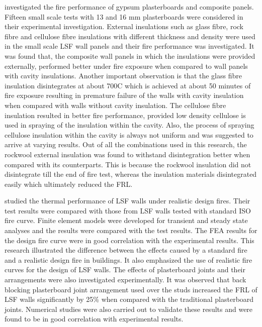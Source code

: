 \citet{Kolarkar2014} investigated the fire performance of gypsum plasterboards and composite panels. Fifteen small scale tests with 13 and 16 mm plasterboards were considered in their experimental investigation. External insulations such as glass fibre, rock fibre and cellulose fibre insulations with different thickness and density were used in the small scale LSF wall panels and their fire performance was investigated. It was found that, the composite wall panels in which the insulations were provided externally, performed better under fire exposure when compared to wall panels with cavity insulations. Another important observation is that the glass fibre insulation disintegrates at about 700\degree C which is achieved at about 50 minutes of fire exposure resulting in premature failure of the walls with cavity insulation when compared with walls without cavity insulation. The cellulose fibre insulation resulted in better fire performance, provided low density cellulose is used in spraying of the insulation within the cavity. Also, the process of spraying cellulose insulation within the cavity is always not uniform and was suggested to arrive at varying results. Out of all the combinations used in this research, the rockwool external insulation was found to withstand disintegration better when compared with its counterparts. This is because the rockwool insulation did not disintegrate till the end of fire test, whereas the insulation materials disintegrated easily which ultimately reduced the FRL. 

\citet{Ariyanayagam2014e} studied the thermal performance of LSF walls under realistic design fires. Their test results were compared with those from LSF walls tested with standard ISO fire curve. Finite element models were developed for transient and steady state analyses and the results were compared with the test results. The FEA results for the design fire curve were in good correlation with the experimental results. This research illustrated the difference between the effects caused by a standard fire and a realistic design fire in buildings. It also emphasized the use of realistic fire curves for the design of LSF walls.  The effects of plasterboard joints and their arrangements were also investigated experimentally. It was observed that back blocking plasterboard joint arrangement used over the studs increased the FRL of LSF walls significantly by 25\% when compared with the traditional plasterboard joints. Numerical studies were also carried out to validate these results and were found to be in good correlation with experimental results. 

